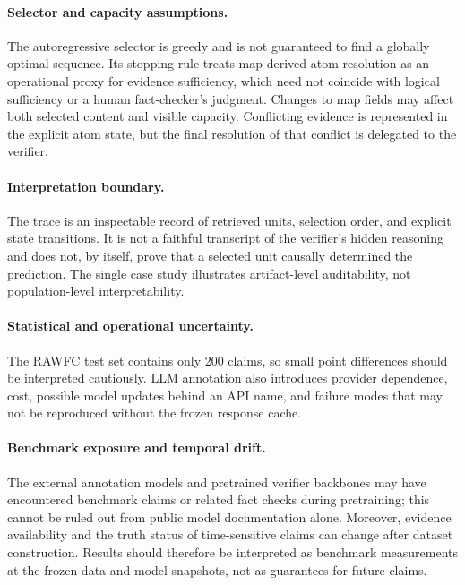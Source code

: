 \paragraph{Selector and capacity assumptions.}
The autoregressive selector is greedy and is not guaranteed to find a
globally optimal sequence.  Its stopping rule treats map-derived atom
resolution as an operational proxy for evidence sufficiency, which need
not coincide with logical sufficiency or a human fact-checker's judgment.
Changes to map fields may affect both selected content and visible
capacity.  Conflicting evidence is represented in the explicit atom state,
but the final resolution of that conflict is delegated to the verifier.

\paragraph{Interpretation boundary.}
The trace is an inspectable record of retrieved units, selection order, and
explicit state transitions.  It is not a faithful transcript of the
verifier's hidden reasoning and does not, by itself, prove that a selected
unit causally determined the prediction.  The single case study illustrates
artifact-level auditability, not population-level interpretability.

\paragraph{Statistical and operational uncertainty.}
The RAWFC test set contains only 200 claims, so small point differences
should be interpreted cautiously.  LLM annotation also introduces
provider dependence, cost, possible model updates behind an API name, and
failure modes that may not be reproduced without the frozen response
cache.

\paragraph{Benchmark exposure and temporal drift.}
The external annotation models and pretrained verifier backbones may have
encountered benchmark claims or related fact checks during pretraining; this
cannot be ruled out from public model documentation alone.  Moreover,
evidence availability and the truth status of time-sensitive claims can
change after dataset construction.  Results should therefore be interpreted
as benchmark measurements at the frozen data and model snapshots, not as
guarantees for future claims.

